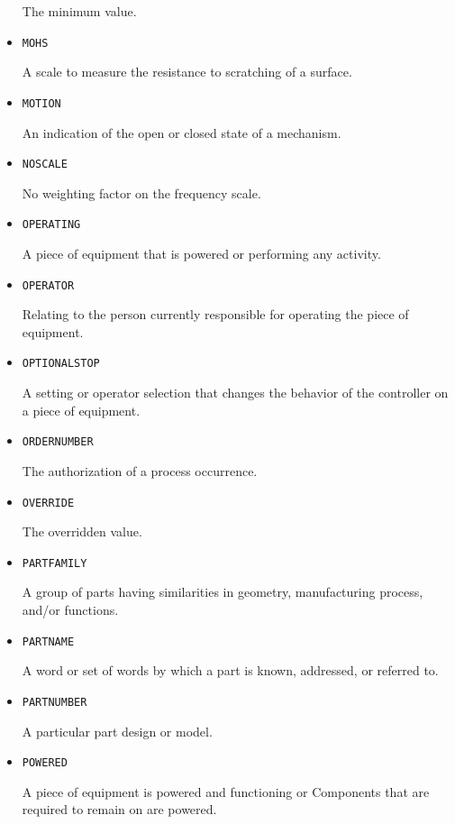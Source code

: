 \begin{itemize}
The minimum value.


\item \texttt{MOHS}  

A scale to measure the resistance to scratching of a surface.


\item \texttt{MOTION}  

An indication of the open or closed state of a mechanism.


\item \texttt{NO\textunderscore SCALE}  

No weighting factor on the frequency scale.


\item \texttt{OPERATING}  

A piece of equipment that is powered or performing any activity.


\item \texttt{OPERATOR}  

Relating to the person currently responsible for operating the piece of equipment.


\item \texttt{OPTIONAL\textunderscore STOP}  

A setting or operator selection that changes the behavior of the controller on a piece of equipment. 


\item \texttt{ORDER\textunderscore NUMBER}  

The authorization of a process occurrence.


\item \texttt{OVERRIDE}  

The overridden value.


\item \texttt{PART\textunderscore FAMILY}  

A group of parts having similarities in geometry, manufacturing process, and/or functions.


\item \texttt{PART\textunderscore NAME}  

A word or set of words by which a part is known, addressed, or referred to.


\item \texttt{PART\textunderscore NUMBER}  

A particular part design or model.


\item \texttt{POWERED}  

A piece of equipment is powered and functioning or \glspl{Component} that are required to remain on are powered.



\end{itemize}
